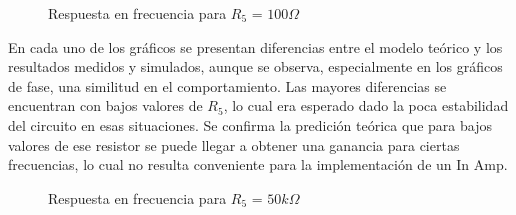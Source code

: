   \begin{figure}[H]
    \centering
    \hfill
    \caption{Respuesta en frecuencia para $R_{5}$ = $100\Omega$}
  \end{figure}

  En cada uno de los gráficos se presentan diferencias entre el modelo teórico y los resultados medidos y simulados, aunque se observa, especialmente en los gráficos de fase, una similitud en el comportamiento. 
  Las mayores diferencias se encuentran con bajos valores de $R_{5}$, lo cual era esperado dado la poca estabilidad del circuito en esas situaciones. Se confirma la predición teórica que para bajos valores de ese resistor se puede
  llegar a obtener una ganancia para ciertas frecuencias, lo cual no resulta conveniente para la implementación de un In Amp. 

\begin{figure}[H]
    \centering
    \hfill
    \caption{Respuesta en frecuencia para $R_{5}$ = $50k\Omega$}
    \label{fig:CMsuperpuesto}
  \end{figure}



